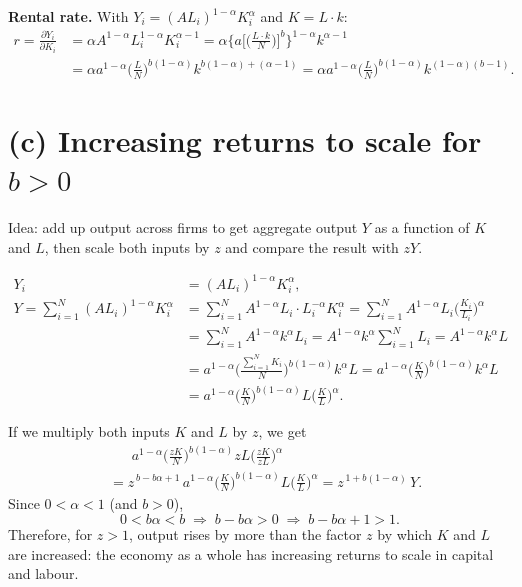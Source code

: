\documentclass[11pt]{article}
\begin{document}
\textbf{Rental rate.} With $Y_i = (AL_i)^{1-\alpha}K_i^{\alpha}$ and $K = L\cdot k$:
\begin{align*}
r = \frac{\partial Y_i}{\partial K_i}
  &= \alpha A^{1-\alpha}L_i^{1-\alpha}K_i^{\alpha-1}
   = \alpha\Big\{a\Big[\Big(\frac{L\cdot k}{N}\Big)\Big]^{b}\Big\}^{1-\alpha}k^{\alpha-1} \\
  &= \alpha a^{1-\alpha}\Big(\frac{L}{N}\Big)^{b(1-\alpha)}k^{b(1-\alpha)+(\alpha-1)}
   = \alpha a^{1-\alpha}\Big(\frac{L}{N}\Big)^{b(1-\alpha)}k^{(1-\alpha)(b-1)}.
\end{align*}

\section*{(c) Increasing returns to scale for $b>0$}

Idea: add up output across firms to get aggregate output $Y$ as a function of $K$ and $L$, then
scale both inputs by $z$ and compare the result with $zY$.

\begin{align*}
Y_i &= (AL_i)^{1-\alpha}K_i^{\alpha}, \\
Y = \sum_{i=1}^{N}(AL_i)^{1-\alpha}K_i^{\alpha}
  &= \sum_{i=1}^{N}A^{1-\alpha}L_i\cdot L_i^{-\alpha}K_i^{\alpha}
   = \sum_{i=1}^{N}A^{1-\alpha}L_i\Big(\frac{K_i}{L_i}\Big)^{\alpha} \\
  &= \sum_{i=1}^{N}A^{1-\alpha}k^{\alpha}L_i
   = A^{1-\alpha}k^{\alpha}\sum_{i=1}^{N}L_i
   = A^{1-\alpha}k^{\alpha}L \\
  &= a^{1-\alpha}\bigg(\frac{\sum_{i=1}^{N}K_i}{N}\bigg)^{b(1-\alpha)}k^{\alpha}L
   = a^{1-\alpha}\Big(\frac{K}{N}\Big)^{b(1-\alpha)}k^{\alpha}L \\
  &= a^{1-\alpha}\Big(\frac{K}{N}\Big)^{b(1-\alpha)}L\Big(\frac{K}{L}\Big)^{\alpha}.
\end{align*}

If we multiply both inputs $K$ and $L$ by $z$, we get
\begin{align*}
&\phantom{=}\; a^{1-\alpha}\Big(\frac{zK}{N}\Big)^{b(1-\alpha)}zL\Big(\frac{zK}{zL}\Big)^{\alpha} \\
&= z^{\,b-b\alpha+1}\,a^{1-\alpha}\Big(\frac{K}{N}\Big)^{b(1-\alpha)}L\Big(\frac{K}{L}\Big)^{\alpha}
 = z^{\,1+b(1-\alpha)}\,Y.
\end{align*}
Since $0<\alpha<1$ (and $b>0$),
\[
0 < b\alpha < b \;\Longrightarrow\; b - b\alpha > 0 \;\Longrightarrow\; b - b\alpha + 1 > 1 .
\]
Therefore, for $z>1$, output rises by more than the factor $z$ by which $K$ and $L$ are increased:
the economy as a whole has increasing returns to scale in capital and labour.
\end{document}
